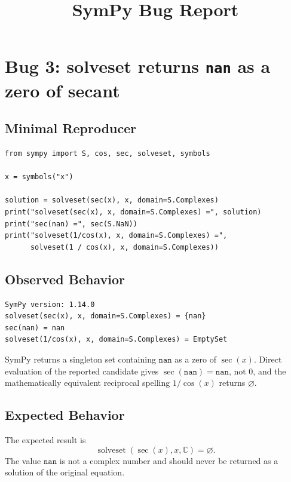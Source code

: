 \documentclass[11pt]{article}
\title{SymPy Bug Report}
\author{}
\date{}
\begin{document}
\maketitle

\section{Bug 3: solveset returns \texttt{nan} as a zero of secant}

\subsection{Minimal Reproducer}

\medskip

\begin{lstlisting}[style=bugpython]
from sympy import S, cos, sec, solveset, symbols

x = symbols("x")

solution = solveset(sec(x), x, domain=S.Complexes)
print("solveset(sec(x), x, domain=S.Complexes) =", solution)
print("sec(nan) =", sec(S.NaN))
print("solveset(1/cos(x), x, domain=S.Complexes) =",
      solveset(1 / cos(x), x, domain=S.Complexes))
\end{lstlisting}

\subsection{Observed Behavior}

\medskip

\begin{lstlisting}[style=bugpython]
SymPy version: 1.14.0
solveset(sec(x), x, domain=S.Complexes) = {nan}
sec(nan) = nan
solveset(1/cos(x), x, domain=S.Complexes) = EmptySet
\end{lstlisting}

SymPy returns a singleton set containing \(\mathtt{nan}\) as a zero of
\(\sec(x)\). Direct evaluation of the reported candidate gives
\(\sec(\mathtt{nan})=\mathtt{nan}\), not \(0\), and the mathematically
equivalent reciprocal spelling \(1/\cos(x)\) returns \(\varnothing\).

\subsection{Expected Behavior}

The expected result is
\[
    \operatorname{solveset}(\sec(x), x, \mathbb{C}) = \varnothing.
\]
The value \(\mathtt{nan}\) is not a complex number and should never be returned
as a solution of the original equation.
\end{document}
